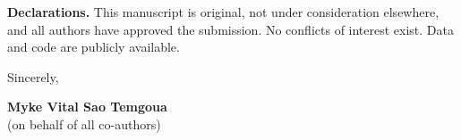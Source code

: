 \documentclass[11pt,letterpaper]{article}
\begin{document}
\textbf{Declarations.} This manuscript is original, not under consideration elsewhere, and all authors have approved the submission. No conflicts of interest exist. Data and code are publicly available.

\vspace{1.5em}

\noindent Sincerely,

\vspace{2em}

\noindent \textbf{Myke Vital Sao Temgoua} \\
(on behalf of all co-authors)

\vspace{2em}
\end{document}
